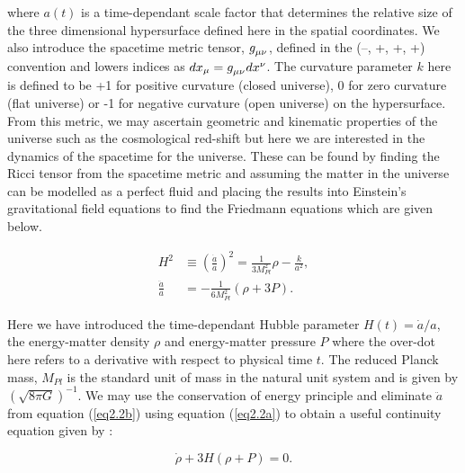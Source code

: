 \documentclass[a4paper,12pt,twoside]{report}
\begin{document}
where $a(t)$ is a time-dependant scale factor that determines the relative size of the three dimensional hypersurface defined here in the spatial coordinates. We also introduce the spacetime metric tensor, $\tensor{g}{_{\mu \nu}}$, defined in the (--, +, +, +) convention and lowers indices as $dx_{\mu} = \tensor{g}{_{\mu \nu}} dx^{\nu}$. The curvature parameter $k$ here is defined to be +1 for positive curvature (closed universe), 0 for zero curvature (flat universe) or -1 for negative curvature (open universe) on the hypersurface. From this metric, we may ascertain geometric and kinematic properties of the universe such as the cosmological red-shift but here we are interested in the dynamics of the spacetime for the universe. These can be found by finding the Ricci tensor from the spacetime metric and assuming the matter in the universe can be modelled as a perfect fluid and placing the results into Einstein's gravitational field equations to find the Friedmann equations \cite{hobson2006general} which are given below.

\begin{subequations}
\begin{align}
H^{2} &\equiv \left(\frac{\dot{a}}{a}\right)^{2} = \frac{1}{3M_{Pl}^{2}}\rho - \frac{k}{a^{2}}, \label{eq2.2a} \\
\frac{\ddot{a}}{a} &= -\frac{1}{6 M_{Pl}^{2}} \left( \rho + 3P \right). \label{eq2.2b}
\end{align}
\end{subequations}

Here we have introduced the time-dependant Hubble parameter $H(t) = \dot{a}/a$, the energy-matter density $\rho$ and energy-matter pressure $P$ where the over-dot here refers to a derivative with respect to physical time $t$. The reduced Planck mass, $M_{Pl}$ is the standard unit of mass in the natural unit system and is given by $(\sqrt{8 \pi G})^{-1}$. We may use the conservation of energy principle and eliminate $\ddot{a}$ from equation (\ref{eq2.2b}) using equation (\ref{eq2.2a}) to obtain a useful continuity equation given by \cite{hobson2006general}:

\begin{equation}
\dot{\rho} + 3H(\rho + P) = 0. \label{eq2.3}
\end{equation}
\end{document}
